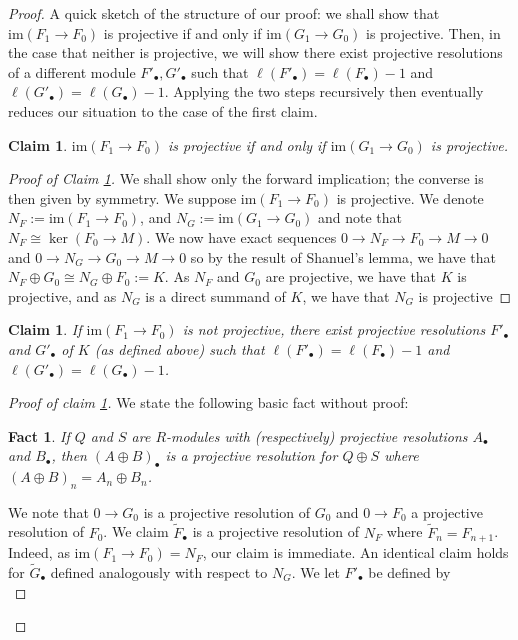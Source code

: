 \documentclass[english]{article}
\newenvironment{subproof}[1][\proofname]{%
	\renewcommand{\qedsymbol}{$\blacksquare$}%
	\begin{proof}[#1]%
	}{%
	\end{proof}%
}
\newtheorem{fact}[theorem]{Fact}
\newtheorem{claim}[theorem]{Claim}
\theoremstyle{remark}
\theoremstyle{definition}
\newcommand{\im}{\mathrm{im}}
\begin{document}
\begin{proof}
	A quick sketch of the structure of our proof: we shall show that $\im(F_1\to F_0)$ is projective if and only if $\im(G_1\to G_0)$ is projective. Then, in the case that neither is projective, we will show there exist projective resolutions of a different module $F'_\bullet, G'_\bullet$ such that $\ell(F'_\bullet)=\ell(F_\bullet)-1$ and $\ell(G'_\bullet)=\ell(G_\bullet)-1$. Applying the two steps recursively then eventually reduces our situation to the case of the first claim.
	\begin{claim}\label{A314case0}
		$\im(F_1\to F_0)$ is projective if and only if $\im(G_1\to G_0)$ is projective.
	\end{claim}
\begin{subproof}[Proof of Claim \ref{A314case0}]
	We shall show only the forward implication; the converse is then given by symmetry. We suppose $\im(F_1\to F_0)$ is projective. We denote $N_F:=\im(F_1\to F_0)$, and $N_G:=\im(G_1\to G_0)$ and note that $N_F\cong \ker (F_0\to M)$. We now have exact sequences $0\to N_F\to F_0\to M\to 0$ and $0\to N_G\to G_0\to M \to 0$ so by the result of Shanuel's lemma, we have that $N_F\oplus G_0\cong N_G \oplus F_0:=K$. As $N_F$ and $G_0$ are projective, we have that $K$ is projective, and as $N_G$ is a direct summand of $K$, we have that $N_G $ is projective
\end{subproof}
\begin{claim}\label{A314case1}
	If $\im(F_1\to F_0)$ is not projective, there exist projective resolutions $F'_\bullet$ and $G'_\bullet$ of $K$ (as defined above) such that $\ell(F'_\bullet)=\ell(F_\bullet)-1$ and $\ell(G'_\bullet)=\ell(G_\bullet)-1$. 
\end{claim}
\begin{subproof}[Proof of claim \ref{A314case1}]
	We state the following basic fact without proof:\begin{fact}\label{tfactA314}
		If $Q$ and $S$ are $R$-modules with (respectively) projective resolutions $A_\bullet $ and $B_\bullet$, then $(A\oplus B)_\bullet$ is a projective resolution for $Q\oplus S$ where $(A\oplus B)_n=A_n\oplus B_n$. 
	\end{fact}
We note that $0\to G_0$ is a projective resolution of $G_0$ and $0\to F_0$ a projective resolution of $F_0$. We claim $\tilde{F}_\bullet$ is a projective resolution of $N_F$ where $\tilde{F}_n=F_{n+1}$. Indeed, as $\im(F_1\to F_0)=N_F$, our claim is immediate. An identical claim holds for $\tilde{G}_\bullet$ defined analogously with respect to $N_G$. We let $F'_\bullet$ be defined by \begin{equation*}

\end{equation*}
\end{subproof}
\end{proof}
\end{document}
